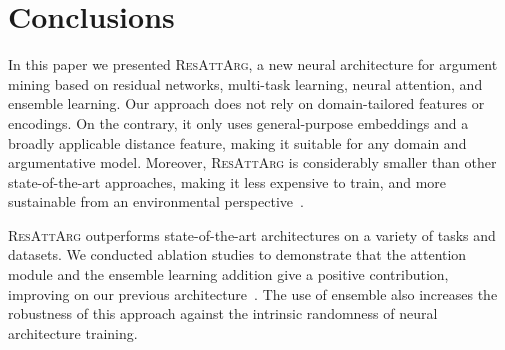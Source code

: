 \documentclass[journal]{IEEEtran}
\begin{document}
\section{Conclusions}
\label{sec:conclusions}


In this paper we presented \textsc{ResAttArg}, a new neural architecture for argument mining based on residual networks, multi-task learning, neural attention, and ensemble learning.
Our approach does not rely on domain-tailored features or encodings. On the contrary, it only uses general-purpose embeddings and a broadly applicable distance feature, making it suitable for any domain and argumentative model.
Moreover, \textsc{ResAttArg} is considerably smaller than other state-of-the-art approaches, making it less expensive to train, and more sustainable from an environmental perspective~\cite{NLPenergy}.

\textsc{ResAttArg} outperforms state-of-the-art architectures on a variety of tasks and datasets. We conducted ablation studies to demonstrate that the attention module and the ensemble learning addition give a positive contribution, improving on our previous architecture~\cite{W18-5201}. The use of ensemble also increases the robustness of this approach against the intrinsic randomness of neural architecture training.
\end{document}
